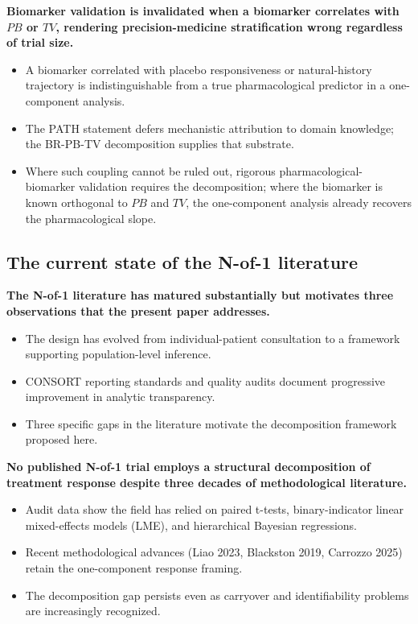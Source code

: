 \documentclass[
  11pt,
]{article}
\begin{document}
\textbf{Biomarker validation is invalidated when a biomarker correlates with $PB$ or $TV$, rendering precision-medicine stratification wrong regardless of trial size.}

\begin{itemize}\setlength{\itemsep}{2pt}\setlength{\parskip}{0pt}
\item A biomarker correlated with placebo responsiveness or natural-history trajectory is indistinguishable from a true pharmacological predictor in a one-component analysis.
\item The PATH statement defers mechanistic attribution to domain knowledge; the BR-PB-TV decomposition supplies that substrate.
\item Where such coupling cannot be ruled out, rigorous pharmacological-biomarker validation requires the decomposition; where the biomarker is known orthogonal to $PB$ and $TV$, the one-component analysis already recovers the pharmacological slope.
\end{itemize}

\subsection{The current state of the N-of-1 literature}\label{the-current-state-of-the-n-of-1-literature}

\textbf{The N-of-1 literature has matured substantially but motivates three observations that the present paper addresses.}

\begin{itemize}\setlength{\itemsep}{2pt}\setlength{\parskip}{0pt}
\item The design has evolved from individual-patient consultation to a framework supporting population-level inference.
\item CONSORT reporting standards and quality audits document progressive improvement in analytic transparency.
\item Three specific gaps in the literature motivate the decomposition framework proposed here.
\end{itemize}

\textbf{No published N-of-1 trial employs a structural decomposition of treatment response despite three decades of methodological literature.}

\begin{itemize}\setlength{\itemsep}{2pt}\setlength{\parskip}{0pt}
\item Audit data show the field has relied on paired t-tests, binary-indicator linear mixed-effects models (LME), and hierarchical Bayesian regressions.
\item Recent methodological advances (Liao 2023, Blackston 2019, Carrozzo 2025) retain the one-component response framing.
\item The decomposition gap persists even as carryover and identifiability problems are increasingly recognized.
\end{itemize}
\end{document}
